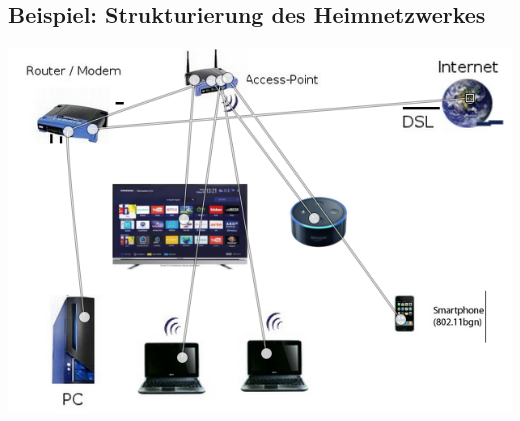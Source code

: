 \documentclass[11pt]{article}
\begin{document}
    \subsection{Beispiel: Strukturierung des Heimnetzwerkes}
    \includegraphics[width=\linewidth]{WLAN-Network.png}
\end{document}
